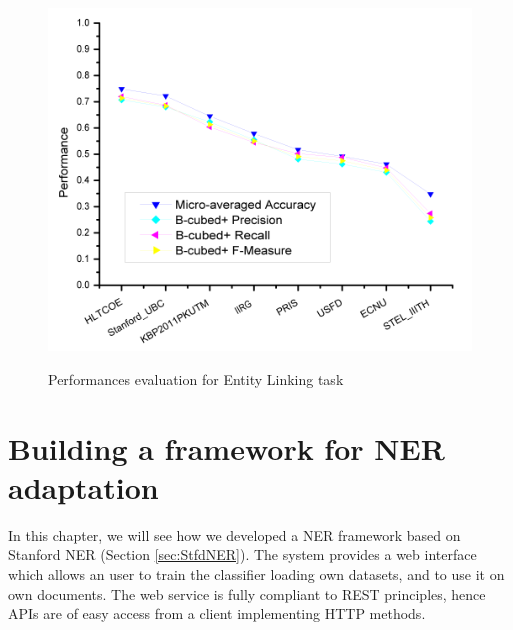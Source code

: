 \documentclass[a4paper,11pt]{report}
\begin{document}
\begin{figure}[htbp]
{\includegraphics[width=\textwidth/2]{kbp2011-optional_scores}}
\caption{Performances evaluation for Entity Linking task}
\label{fig:elresults}
\end{figure}

\chapter{Building a framework for NER adaptation}
\label{ch:pimp}
In this chapter, we will see how we developed a NER framework based on Stanford NER (Section \ref{sec:StfdNER}). The system provides a web interface which allows an user to train the classifier loading own datasets, and to use it on own documents. %
The web service is fully compliant to REST principles, %
hence APIs are of easy access from a client implementing HTTP methods. 
\end{document}
